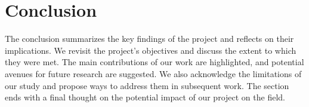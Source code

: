 \documentclass{article}
\begin{document}
\section{Conclusion}
    The conclusion summarizes the key findings of the project and reflects on their implications. We revisit the project's objectives and discuss the extent to which they were met. The main contributions of our work are highlighted, and potential avenues for future research are suggested. We also acknowledge the limitations of our study and propose ways to address them in subsequent work. The section ends with a final thought on the potential impact of our project on the field.
\end{document}
